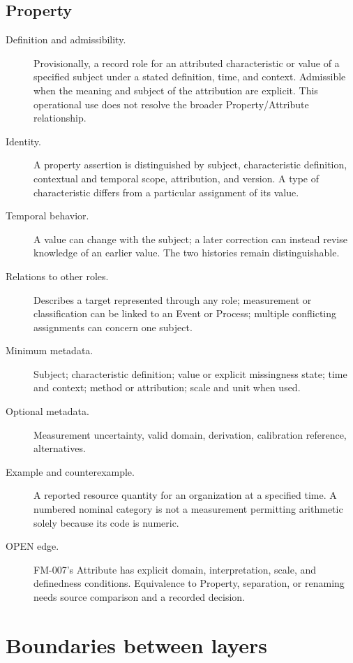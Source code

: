 \documentclass[11pt,a4paper]{article}
\begin{document}
\subsection{Property}
\begin{description}
\item[Definition and admissibility.] Provisionally, a record role for an attributed characteristic or value of a specified subject under a stated definition, time, and context. Admissible when the meaning and subject of the attribution are explicit. This operational use does not resolve the broader Property/Attribute relationship.
\item[Identity.] A property assertion is distinguished by subject, characteristic definition, contextual and temporal scope, attribution, and version. A type of characteristic differs from a particular assignment of its value.
\item[Temporal behavior.] A value can change with the subject; a later correction can instead revise knowledge of an earlier value. The two histories remain distinguishable.
\item[Relations to other roles.] Describes a target represented through any role; measurement or classification can be linked to an Event or Process; multiple conflicting assignments can concern one subject.
\item[Minimum metadata.] Subject; characteristic definition; value or explicit missingness state; time and context; method or attribution; scale and unit when used.
\item[Optional metadata.] Measurement uncertainty, valid domain, derivation, calibration reference, alternatives.
\item[Example and counterexample.] A reported resource quantity for an organization at a specified time. A numbered nominal category is not a measurement permitting arithmetic solely because its code is numeric.
\item[OPEN edge.] FM-007's Attribute has explicit domain, interpretation, scale, and definedness conditions. Equivalence to Property, separation, or renaming needs source comparison and a recorded decision.
\end{description}

\section{Boundaries between layers}
\end{document}
